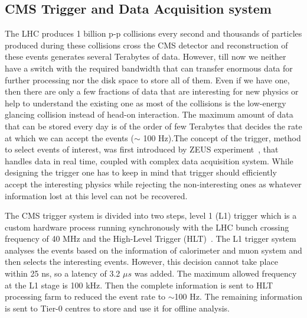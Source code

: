 \subsection{CMS Trigger and Data Acquisition system} %
\label{sub:cms_trigger_and_data_acquisition_system}
The LHC produces 1 billion p-p collisions every second and thousands of particles produced during these collisions cross the CMS detector and reconstruction of these events generates several Terabytes of data. However, till now we neither have a switch with the required bandwidth that can transfer enormous data for further processing nor the disk space to store all of them. Even if we have one, then there are only a few fractions of data that are interesting for new physics or help to understand the existing one as most of the collisions is the low-energy glancing collision instead of head-on interaction. The maximum amount of data that can be stored every day is of the order of few Terabytes that decides the rate at which we can accept the events ($\sim$ 100 Hz).The concept of the trigger, method to select events of interest, was first introduced by ZEUS experiment~\cite{ZEUSCollaboration1993}, that handles data in real time, coupled with complex data acquisition system. While designing the trigger one has to keep in mind that trigger should efficiently accept the interesting physics while rejecting the non-interesting ones as whatever information lost at this level can not be recovered.

The CMS trigger system is divided into two steps, level 1 (L1) trigger which is a custom hardware process running synchronously with the LHC bunch crossing frequency of 40 MHz and the High-Level Trigger (HLT)~\cite{paper:JINST:CMSCollaboration}. The L1 trigger system analyses the events based on the information of calorimeter and muon system and  then selects the interesting events. However, this decision cannot take place within 25 ns, so a latency of 3.2 $\mu s$ was added. The maximum allowed frequency at the L1 stage is 100 kHz. Then the complete information is sent to HLT processing farm to reduced the event rate to $\sim$100 Hz. The remaining information is sent to Tier-0 centres to store and use it for offline analysis.




